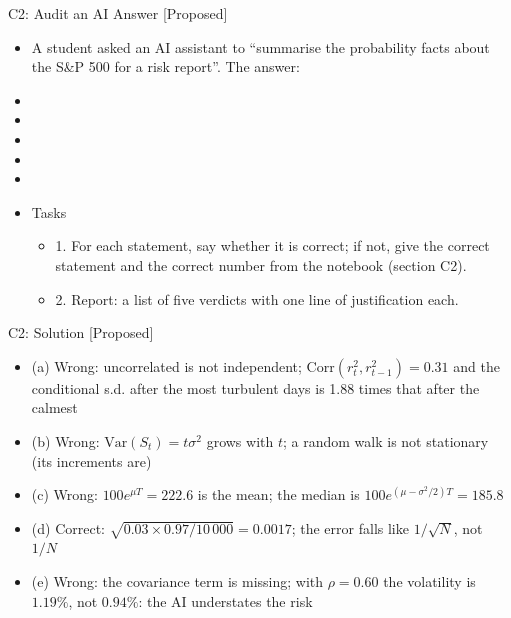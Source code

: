 \begin{frame}{C2: Audit an AI Answer [Proposed]}
\itemsize{\scriptsize}
\begin{itemize}
    \item A student asked an AI assistant to ``summarise the probability facts about the S\&P 500 for a risk report''. The answer:
    \item {}
    \item {}
    \item {}
    \item {}
    \item {}
    \item Tasks
    \begin{itemize}
        \item 1. For each statement, say whether it is correct; if not, give the correct statement and the correct number from the notebook (section C2).
        \item 2. Report: a list of five verdicts with one line of justification each.
    \end{itemize}
\end{itemize}
\end{frame}

\ifsolutions
\begin{frame}{C2: Solution [Proposed]}
\itemsize{\footnotesize}
\begin{itemize}
    \item (a) Wrong: uncorrelated is not independent; $\text{Corr}(r_t^2, r_{t-1}^2) = 0.31$ and the conditional s.d. after the most turbulent days is 1.88 times that after the calmest
    \item (b) Wrong: $\text{Var}(S_t) = t\sigma^2$ grows with $t$; a random walk is not stationary (its increments are)
    \item (c) Wrong: $100e^{\mu T} = 222.6$ is the mean; the median is $100e^{(\mu - \sigma^2/2)T} = 185.8$
    \item (d) Correct: $\sqrt{0.03 \times 0.97/10\,000} = 0.0017$; the error falls like $1/\sqrt{N}$, not $1/N$
    \item (e) Wrong: the covariance term is missing; with $\rho = 0.60$ the volatility is $1.19\%$, not $0.94\%$: the AI understates the risk
\end{itemize}
\end{frame}
\fi


